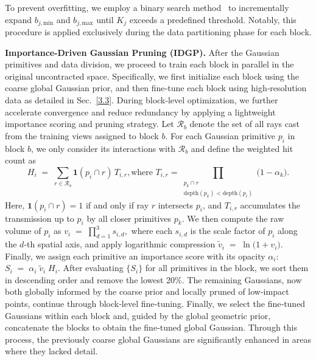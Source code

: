 To prevent overfitting, we employ a binary search method~\cite{binary} to incrementally expand $b_{j, \text{min}}$ and $b_{j, \text{max}}$ until $K_j$ exceeds a predefined threshold. 
Notably, this procedure is applied exclusively during the data partitioning phase for each block.


\noindent\textbf{Importance-Driven Gaussian Pruning (IDGP).}
After the Gaussian primitives and data division, we proceed to train each block in parallel in the original uncontracted space. Specifically, we first initialize each block using the coarse global Gaussian prior, and then fine‐tune each block using high‐resolution data as detailed in Sec.~\ref{3.3}. During block‐level optimization, we further accelerate convergence and reduce redundancy by applying a lightweight importance scoring and pruning strategy. Let $\mathcal{R}_b$ denote the set of all rays cast from the training views assigned to block $b$. For each Gaussian primitive $p_i$ in block $b$, we only consider its interactions with $\mathcal{R}_b$ and define the weighted hit count as
\small{
\begin{equation}
H_i \;=\;\sum_{r\in\mathcal{R}_b}\mathbf{1}(p_i \cap r)\,T_{i,r},
\text{where } T_{i,r} =\prod_{\substack{p_k \cap r\\\mathrm{depth}(p_k)<\mathrm{depth}(p_i)}}\bigl(1 - \alpha_k\bigr).
\end{equation}
}
Here, $\mathbf{1}(p_i \cap r)=1$ if and only if ray $r$ intersects $p_i$, and $T_{i,r}$ accumulates the transmission up to $p_i$ by all closer primitives $p_k$. We then compute the raw volume of $p_i$ as
\small{
$
v_i \;=\;\prod_{d=1}^3 s_{i,d},
$}
where each \(s_{i,d}\) is the scale factor of $p_i$ along the $d$-th spatial axis, and apply logarithmic compression
$
\widetilde{v}_i \;=\;\ln\bigl(1 + v_i\bigr).
$
Finally, we assign each primitive an importance score with its opacity $\alpha_i$:
$
S_i \;=\;\alpha_i\;\widetilde{v}_i\;H_i.
$
After evaluating $\{S_i\}$ for all primitives in the block, we sort them in descending order and remove the lowest 20\%. The remaining Gaussians, now both globally informed by the coarse prior and locally pruned of low‐impact points, continue through block‐level fine‐tuning. Finally, we select the fine‐tuned Gaussians within each block and, guided by the global geometric prior, concatenate the blocks to obtain the fine‐tuned global Gaussian. Through this process, the previously coarse global Gaussians are significantly enhanced in areas where they lacked detail.








